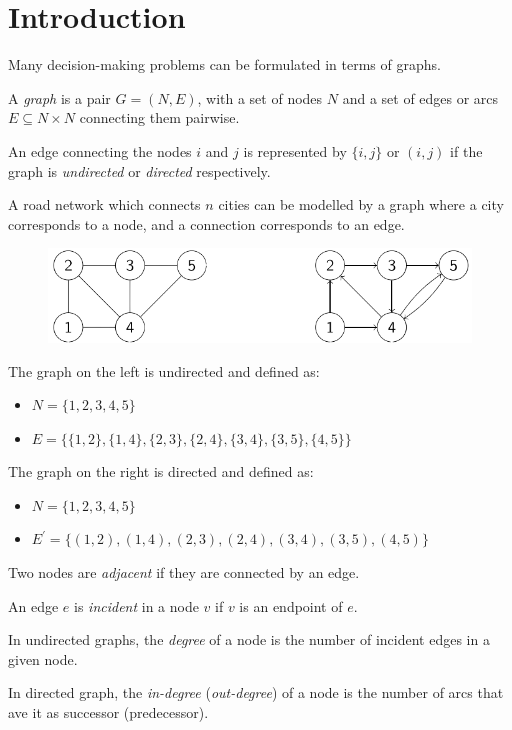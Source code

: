 \documentclass[12pt, a4paper]{report}
\newtheorem[style=M,bodystyle=\normalfont]{proposition}{Proposition}
\newtheorem[style=M,bodystyle=\normalfont]{theorem}{Theorem}
\newtheorem[style=M,bodystyle=\normalfont]{corollary}{Corollary}
\newtheorem[style=M,bodystyle=\normalfont]{lemma}{Lemma}
\newtheorem[style=M,bodystyle=\normalfont]{definition}{Definition}
\begin{document}
    \section{Introduction}
    Many decision-making problems can be formulated in terms of graphs.
    \begin{definition}
        A \emph{graph} is a pair $G=(N,E)$, with a set of nodes $N$ and a set of edges or arcs $E \subseteq N \times N$ connecting them pairwise. 

        An edge connecting the nodes $i$ and $j$ is represented by $\{i,j\}$ or $(i,j)$ if the graph is \emph{undirected} or \emph{directed} respectively. 
    \end{definition}
    \begin{example}
        A road network which connects $n$ cities can be modelled by a graph where a city corresponds to a node, and a connection corresponds to an edge. 
        \begin{figure}[H]
            \centering
            \includegraphics[width=0.75\linewidth]{images/graph.png}
        \end{figure}
        The graph on the left is undirected and defined as: 
        \begin{itemize}
            \item $N=\{1,2,3,4,5\}$
            \item $E=\{\{1,2\},\{1,4\},\{2,3\},\{2,4\},\{3,4\},\{3,5\},\{4,5\}\}$
        \end{itemize}
        The graph on the right is directed and defined as: 
        \begin{itemize}
            \item $N=\{1,2,3,4,5\}$
            \item $E^{'}=\{(1,2),(1,4),(2,3),(2,4),(3,4),(3,5),(4,5)\}$
        \end{itemize}
    \end{example}
    \begin{definition}
        Two nodes are \emph{adjacent} if they are connected by an edge. 
        
        An edge $e$ is \emph{incident} in a node $v$ if $v$ is an endpoint of $e$. 
        
        In undirected graphs, the \emph{degree} of a node is the number of incident edges in a given node. 
        
        In directed graph, the \emph{in-degree} (\emph{out-degree}) of a node is the number of arcs that ave it as successor (predecessor).
    \end{definition}
\end{document}
